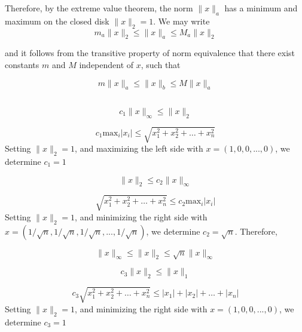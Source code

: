 \documentclass[11pt]{article} %
\begin{document}
Therefore, by the extreme value theorem, the norm $\| x \|_a$ has a minimum and maximum on the closed disk $\| x \|_2 =1$. We may write
\begin{equation}
m_a \| x \| _2 \le \| x \|_a \le M_a \|x\|_2
\end{equation}

and it follows from the transitive property of norm equivalence that there exist constants $m$ and $M$ independent of $x$, such that

\begin{equation}
\boxed{m \|x\|_a \le \| x\|_b \le M \| x \| _a}
\end{equation}

\subsection{} %


\begin{equation}
c_1 \| x \|_\infty \le \|x \|_2
\end{equation}

\begin{equation}
c_1 \textrm{max}_i |x_i | \le \sqrt{x_1^2 + x_2^2 + \hdots + x_n^2}
\end{equation}
Setting $\| x \|_2 =1$, and maximizing the left side with  $x = (1, 0 ,0, ..., 0)$, we determine $c_1 = 1$

\begin{equation}
 \|x \|_2 \le c_2 \| x \|_\infty 
\end{equation}

\begin{equation}
\sqrt{x_1^2 + x_2^2 + \hdots + x_n^2} \le c_2 \textrm{max}_i |x_i | 
\end{equation}
Setting $\| x \|_2 =1$, and minimizing the right side with $x = (1/\sqrt{n}, 1/\sqrt{n} ,1/\sqrt{n}, ..., 1/\sqrt{n})$, we determine $c_2 = \sqrt{n}$. Therefore, 

\begin{equation}
\boxed{\| x \| _\infty \le \| x \|_2 \le \sqrt{n} \|x\|_\infty}
\end{equation}

\begin{equation}
c_3 \| x \|_2 \le \|x \|_1
\end{equation}

\begin{equation}
c_3 \sqrt{x_1^2 + x_2^2 + \hdots + x_n^2} \le |x_1| + |x_2| + \hdots + |x_n|
\end{equation}
Setting $\| x \|_2 =1$, and minimizing the right side with $x = (1, 0 ,0, ..., 0)$, we determine $c_3 = 1$
\end{document}
